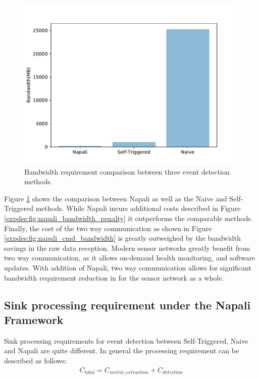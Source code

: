 \begin{figure}[h]
    \centering
    \includegraphics[width=0.8\linewidth]{img/napali_eval/napali_bandwidth_comparison.pdf}
    \caption{Bandwidth requirement comparison between three event detection methods.}
    \label{expdes:fig:bandwidth_master_comparison}
\end{figure}

Figure \ref{expdes:fig:bandwidth_master_comparison} shows the comparison between Napali as well as the Naive and Self-Triggered methods.
While Napali incurs additional costs described in Figure \ref{expdes:fig:napali_bandwidth_penalty} it outperforms the comparable methods.
Finally, the cost of the two way communication as shown in Figure \ref{expdes:fig:napali_cmd_bandwidth} is greatly outweighed by the bandwidth savings in the raw data reception.
Modern sensor networks greatly benefit from two way communication, as it allows on-demand health monitoring, and software updates.
With addition of Napali, two way communication allows for significant bandwidth requirement reduction in for the sensor network as a whole.

\subsection{Sink processing requirement under the Napali Framework}\label{subsec:sink-processing-requirement-under-the-napali-framework}
Sink processing requirements for event detection between Self-Triggered, Naive and Napali are quite different.
In general the processing requirement can be described as follows:
\begin{equation}\label{eq:detection_cost}
\begin{aligned}
    C_{total} = C_{metric\_extraction} + C_{detection}
\end{aligned}
\end{equation}

